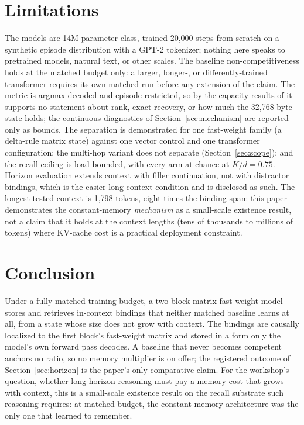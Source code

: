\documentclass{article}
\begin{document}
\section{Limitations}
\label{sec:limitations}

The models are
14M-parameter class, trained 20{,}000 steps from scratch on a synthetic
episode distribution with a GPT-2 tokenizer; nothing here speaks to
pretrained models, natural text, or other scales. The baseline
non-competitiveness holds at the matched budget only: a larger, longer-,
or differently-trained transformer requires its own matched run before any
extension of the claim. The metric is argmax-decoded and
episode-restricted, so by the capacity results of
\citet{nichani2024understanding} it supports no statement about rank,
exact recovery, or how much the 32{,}768-byte state holds; the continuous
diagnostics of Section~\ref{sec:mechanism} are reported only as
bounds. The separation is demonstrated for one fast-weight family (a
delta-rule matrix state) against one vector control and one transformer
configuration; the multi-hop variant does not separate
(Section~\ref{sec:scope}); and the recall ceiling is load-bounded, with
every arm at chance at $K/d = 0.75$. Horizon evaluation extends context
with filler continuation, not with distractor bindings, which is the
easier long-context condition and is disclosed as such. The longest
tested context is 1{,}798 tokens, eight times the binding
span: %
this paper demonstrates the constant-memory \emph{mechanism} as a
small-scale existence result, not a claim that it holds at the context
lengths (tens of thousands to millions of tokens) where KV-cache cost is
a practical deployment constraint.

\section{Conclusion}

Under a fully matched training budget, a two-block matrix fast-weight
model stores and retrieves in-context bindings that neither matched
baseline learns at all, from a state whose size does not grow with
context. The bindings are causally localized to the first block's
fast-weight matrix and stored in a form only the model's own forward
pass decodes. A baseline that never becomes competent anchors no ratio,
so no memory multiplier is on offer; the registered outcome of
Section~\ref{sec:horizon} is the paper's only comparative claim. For the
workshop's question, whether long-horizon reasoning must pay a memory
cost that grows with context, this is a small-scale existence result on
the recall substrate such reasoning requires: at matched budget, the
constant-memory architecture was the only one that learned to remember.
\end{document}
